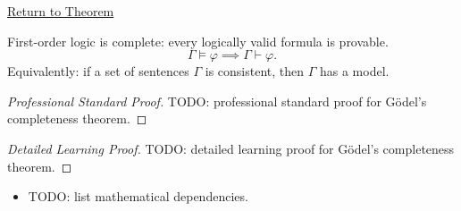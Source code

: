 \newpage
{}
\label{prf:godel-complete}

\begin{remark*}[Return]
\hyperref[thm:godel-complete]{Return to Theorem}
\end{remark*}

\begin{theorem*}
First-order logic is complete: every logically valid formula is provable.
\[
\Gamma \models \varphi \implies \Gamma \vdash \varphi.
\]
Equivalently: if a set of sentences $\Gamma$ is consistent, then $\Gamma$ has a
model.
\end{theorem*}

\begin{proof}[Professional Standard Proof]
\LRAProofBodyStart
TODO: professional standard proof for G\"{o}del's completeness theorem.
\end{proof}

\begin{proof}[Detailed Learning Proof]
\LRAProofBodyStart
TODO: detailed learning proof for G\"{o}del's completeness theorem.
\end{proof}

\begin{remark*}
\end{remark*}

\begin{dependencies}
\begin{itemize}
  \item TODO: list mathematical dependencies.
\end{itemize}
\end{dependencies}

\clearpage
